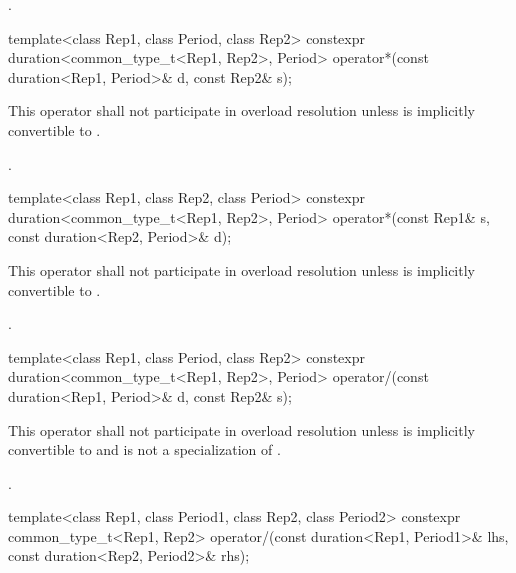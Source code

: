\begin{itemdescr}
\pnum
\returns {}.
\end{itemdescr}

%
\begin{itemdecl}
template<class Rep1, class Period, class Rep2>
  constexpr duration<common_type_t<Rep1, Rep2>, Period>
    operator*(const duration<Rep1, Period>& d, const Rep2& s);
\end{itemdecl}

\begin{itemdescr}
\pnum
\remarks This operator shall not participate in overload
resolution unless  is implicitly convertible to .

\pnum
\returns {}.
\end{itemdescr}

%
\begin{itemdecl}
template<class Rep1, class Rep2, class Period>
  constexpr duration<common_type_t<Rep1, Rep2>, Period>
    operator*(const Rep1& s, const duration<Rep2, Period>& d);
\end{itemdecl}

\begin{itemdescr}
\pnum
\remarks This operator shall not participate in overload
resolution unless  is implicitly convertible to .

\pnum
\returns {}.
\end{itemdescr}

%
\begin{itemdecl}
template<class Rep1, class Period, class Rep2>
  constexpr duration<common_type_t<Rep1, Rep2>, Period>
    operator/(const duration<Rep1, Period>& d, const Rep2& s);
\end{itemdecl}

\begin{itemdescr}
\pnum
\remarks This operator shall not participate in overload
resolution unless  is implicitly convertible to 
and  is not a specialization of .

\pnum
\returns {}.
\end{itemdescr}

%
\begin{itemdecl}
template<class Rep1, class Period1, class Rep2, class Period2>
  constexpr common_type_t<Rep1, Rep2>
    operator/(const duration<Rep1, Period1>& lhs, const duration<Rep2, Period2>& rhs);
\end{itemdecl}

